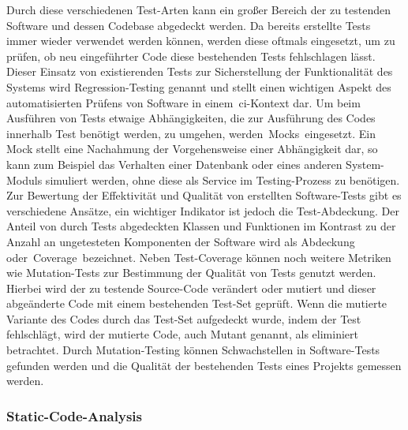 Durch diese verschiedenen Test-Arten kann ein großer Bereich der zu testenden Software und dessen Codebase abgedeckt
werden.
Da bereits erstellte Tests immer wieder verwendet werden können, werden diese oftmals eingesetzt, um zu prüfen, ob neu
eingeführter Code diese bestehenden Tests fehlschlagen lässt.
Dieser Einsatz von existierenden Tests zur Sicherstellung der Funktionalität des Systems wird Regression-Testing
genannt und stellt einen wichtigen Aspekt des automatisierten Prüfens von Software in einem\ \acrshort{ci}-Kontext dar.
Um beim Ausführen von Tests etwaige Abhängigkeiten, die zur Ausführung des Codes innerhalb Test benötigt werden, zu
umgehen, werden\ \glqq Mocks\grqq\ eingesetzt.
Ein Mock stellt eine Nachahmung der Vorgehensweise einer Abhängigkeit dar, so kann zum Beispiel das Verhalten
einer Datenbank oder eines anderen System-Moduls simuliert werden, ohne diese als Service im Testing-Prozess zu
benötigen.
Zur Bewertung der Effektivität und Qualität von erstellten Software-Tests gibt es verschiedene Ansätze, ein
wichtiger Indikator ist jedoch die Test-Abdeckung.
Der Anteil von durch Tests abgedeckten Klassen und Funktionen im Kontrast zu der Anzahl an
ungetesteten Komponenten der Software wird als Abdeckung oder\ \glqq Coverage\grqq\ bezeichnet.
Neben Test-Coverage können noch weitere Metriken wie Mutation-Tests zur Bestimmung der Qualität von Tests genutzt
werden.
Hierbei wird der zu testende Source-Code verändert oder mutiert und dieser abgeänderte Code mit einem
bestehenden Test-Set geprüft.
Wenn die mutierte Variante des Codes durch das Test-Set aufgedeckt wurde, indem der Test fehlschlägt, wird
der mutierte Code, auch Mutant genannt, als eliminiert betrachtet.
Durch Mutation-Testing können Schwachstellen in Software-Tests gefunden werden und die Qualität der bestehenden
Tests eines Projekts gemessen werden.

\subsubsection{Static-Code-Analysis}

